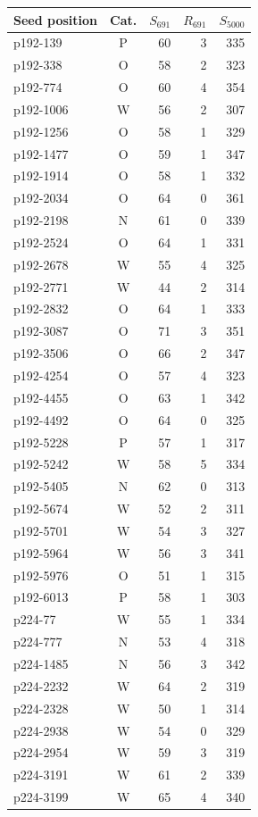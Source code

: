 \begin{minipage}[t]{0.48\linewidth}\centering
\begin{tabular}{lcrrr}\toprule
Seed position & Cat. & $S_{691}$ & $R_{691}$ & $S_{5000}$\\\midrule
p192-139 & P & 60 & 3 & 335\\
p192-338 & O & 58 & 2 & 323\\
p192-774 & O & 60 & 4 & 354\\
p192-1006 & W & 56 & 2 & 307\\
p192-1256 & O & 58 & 1 & 329\\
p192-1477 & O & 59 & 1 & 347\\
p192-1914 & O & 58 & 1 & 332\\
p192-2034 & O & 64 & 0 & 361\\
p192-2198 & N & 61 & 0 & 339\\
p192-2524 & O & 64 & 1 & 331\\
p192-2678 & W & 55 & 4 & 325\\
p192-2771 & W & 44 & 2 & 314\\
p192-2832 & O & 64 & 1 & 333\\
p192-3087 & O & 71 & 3 & 351\\
p192-3506 & O & 66 & 2 & 347\\
p192-4254 & O & 57 & 4 & 323\\
p192-4455 & O & 63 & 1 & 342\\
p192-4492 & O & 64 & 0 & 325\\
p192-5228 & P & 57 & 1 & 317\\
p192-5242 & W & 58 & 5 & 334\\
p192-5405 & N & 62 & 0 & 313\\
p192-5674 & W & 52 & 2 & 311\\
p192-5701 & W & 54 & 3 & 327\\
p192-5964 & W & 56 & 3 & 341\\
p192-5976 & O & 51 & 1 & 315\\
p192-6013 & P & 58 & 1 & 303\\
p224-77 & W & 55 & 1 & 334\\
p224-777 & N & 53 & 4 & 318\\
p224-1485 & N & 56 & 3 & 342\\
p224-2232 & W & 64 & 2 & 319\\
p224-2328 & W & 50 & 1 & 314\\
p224-2938 & W & 54 & 0 & 329\\
p224-2954 & W & 59 & 3 & 319\\
p224-3191 & W & 61 & 2 & 339\\
p224-3199 & W & 65 & 4 & 340\\
\bottomrule\end{tabular}\end{minipage}
